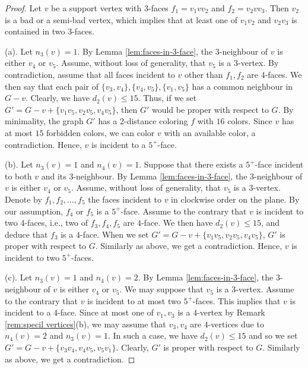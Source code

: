 \documentclass[10pt,a4paper]{amsart}
\begin{document}
\begin{proof} 
Let $v$ be a support vertex with $3$-faces $f_1=v_1vv_2$ and $f_2=v_2vv_3$. Then $v_2$ is a bad or a semi-bad vertex, which implies that at least one of $v_1v_2$ and $v_2v_3$ is contained in two $3$-faces.

(a).  Let $n_3(v)=1$.  By Lemma \ref{lem:faces-in-3-face}, the $3$-neighbour of $v$ is either $v_4$ or $v_5$. Assume, without loss of generality,  that $v_5$ is a $3$-vertex. By contradiction, assume that all faces incident to $v$ other than $f_1,f_2$ are $4$-faces. We then say that each pair of $\{v_3,v_4\}, \{v_4,v_5\}, \{v_1,v_5\}$ has a common neighbour in $G-v$. Clearly, we have $d_2(v)\leq 15$. Thus, if we set $G'=G-v+\{v_1v_5,v_2v_5,v_4v_5\}$, then $G'$ would be proper with respect to $G$. By minimality, the graph $G'$ has a 2-distance coloring $f$ with $16$ colors. Since $v$ has at most $15$ forbidden colors, we can color $v$ with an available color, a contradiction. Hence, $v$ is incident to a $5^+$-face.

(b). Let $n_3(v)=1$ and $n_4(v)=1$. Suppose that there exists a $5^+$-face incident to  both $v$ and its $3$-neighbour.  By Lemma \ref{lem:faces-in-3-face}, the $3$-neighbour of $v$ is either $v_4$ or $v_5$. Assume, without loss of generality,  that $v_5$ is a $3$-vertex.   Denote by $f_1,f_2,\ldots,f_5$ the faces incident to $v$ in clockwise order on the plane. By our assumption, $f_4$ or $f_5$ is a $5^+$-face.
Assume to the contrary that $v$ is incident to two $4$-faces, i.e., two of $f_3,f_4,f_5$ are $4$-face. We then have $d_2(v)\leq 15$, and deduce that $f_3$ is a $4$-face.
When we set $G'=G-v+\{v_1v_5,v_2v_5,v_4v_5\}$, $G'$ is proper with respect to $G$. Similarly as above, we get a contradiction. Hence, $v$ is incident to two $5^+$-faces.


(c).  Let $n_3(v)=1$ and $n_4(v)=2$. By Lemma \ref{lem:faces-in-3-face}, the $3$-neighbour of $v$ is either $v_4$ or $v_5$. We may suppose that $v_5$ is a $3$-vertex. Assume to the contrary that $v$ is incident to at most two $5^+$-faces. This implies that $v$ is incident to a $4$-face. Since at most one of $v_1,v_3$ is a $4$-vertex by Remark \ref{rem:specil vertices}(b), we may assume that $v_3,v_4$ are $4$-vertices due to $n_4(v)= 2$ and $n_3(v)=1$.  In such a case, we have $d_2(v)\leq 15$ and so we set $G'=G-v+\{v_3v_4,v_4v_5,v_5v_1\}$.  Clearly,  $G'$ is proper with respect to $G$.
Similarly as above, we get a contradiction. 



\end{proof}
\end{document}
